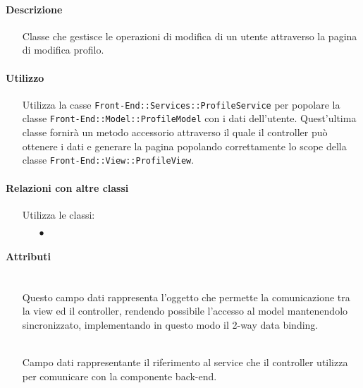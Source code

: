 \paragraph*{Descrizione}
\begin{itemize}
\item[] Classe che gestisce le operazioni di modifica di un utente attraverso la pagina di modifica profilo.
\end{itemize}

\paragraph*{Utilizzo}
\begin{itemize}
\item[] Utilizza la casse \texttt{Front-End::Services::ProfileService} per popolare la classe \texttt{Front-End::Model::ProfileModel} con i dati dell'utente. Quest'ultima classe fornirà un metodo accessorio attraverso il quale il controller può ottenere i dati e generare la pagina popolando correttamente lo scope della classe \texttt{Front-End::View::ProfileView}.
\end{itemize}

\paragraph*{Relazioni con altre classi}
\begin{itemize}


\item[] Utilizza le classi:
\begin{itemize}
\item[$\bullet$] 
\end{itemize}
\end{itemize}

\paragraph*{Attributi}
\begin{itemize}
\item[]  \\ Questo campo dati rappresenta l'oggetto che permette la comunicazione tra la view ed il controller, rendendo possibile l’accesso al model mantenendolo sincronizzato, implementando in questo modo il 2-way data binding.
\item[]  \\ Campo dati rappresentante il riferimento al service che il controller utilizza per comunicare con la componente back-end.
\end{itemize}

